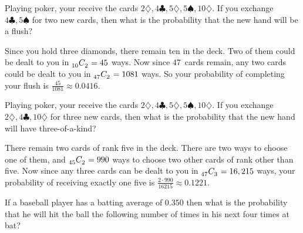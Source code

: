 \documentclass[answers,12pt]{exam}
\newcommand\ncr[2]{\tensor[_{#1}]C{_{#2}}}
\begin{document}
\begin{questions}

\question Playing poker, your receive the cards
$2\diamondsuit,4\clubsuit,5\diamondsuit,5\spadesuit,10\diamondsuit$.
If you exchange $4\clubsuit,5\spadesuit$ for two new cards,
then what is the probability that the new hand will be a flush?
\begin{solution}
Since you hold three diamonds, there remain ten in the deck.
Two of them could be dealt to you in $\ncr{10}{2}=45$ ways.
Now since $47$~cards remain, any two cards could be dealt to you in
$\ncr{47}{2}=1081$ ways. So your probability of completing your flush
is $\frac{45}{1081}\approx 0.0416$.
\end{solution}

\question Playing poker, your receive the cards
$2\diamondsuit,4\clubsuit,5\diamondsuit,5\spadesuit,10\diamondsuit$.
If you exchange $2\diamondsuit,4\clubsuit,10\diamondsuit$ for
three new cards, then what is the probability that the new hand
will have three-of-a-kind?
\begin{solution}
There remain two cards of rank five in the deck. There are two
ways to choose one of them, and $\ncr{45}{2}=990$ ways to choose
two other cards of rank other than five. Now since any three cards
can be dealt to you in $\ncr{47}{3}=16,215$ ways, your probability
of receiving exactly one five is $\frac{2\cdot 990}{16215}\approx 0.1221$.
\end{solution}
\question If a baseball player has a batting average
of $0.350$ then what is the probability that he
will hit the ball the following number of times in his next four
times at bat?


\end{questions}
\end{document}
